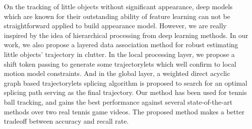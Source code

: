 {On the tracking of little objects without significant appearance, deep models which are known for their outstanding ability of feature learning can not be straightforward applied to build appearance model. However, we are really inspired by the idea of hierarchical processing from deep learning methods. In our work, we also propose a layered data association method for robust estimating little objects' trajectory in clutter. In the local processing layer, we propose a shift token passing to generate some trajectorylets which well confirm to local motion model constraints. And in the global layer, a weighted direct acyclic graph based trajectorylets splicing algorithm is proposed to search for an optimal splicing path serving as the final trajectory. Our method has been used for tennis ball tracking, and gains the best performance against several state-of-the-art methods over two real tennis game videos. The proposed method makes a better tradeoff between accuracy and recall rate.

}


\makecover

